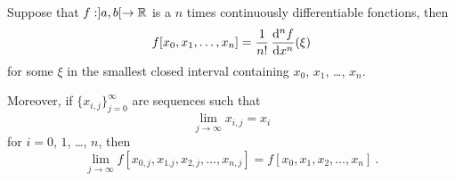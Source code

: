 \begin{prop}
Suppose that $f:]a,b[\rightarrow \mathbb{R}$ is a $n$ times continuously
differentiable fonctions, then
\begin{equation}\label{propA}
f[x_0,x_1,\ldots,x_n] = \frac{1}{n!}\,\frac{\mathrm{d}^{n}{f}}{\mathrm{d}{x}^{n}}(\xi)
\end{equation}
for some $\xi$ in the smallest closed interval containing $x_0$,
$x_1$, \ldots, $x_n$.

Moreover, if $\{x_{i,j}\}_{j=0}^\infty$ are sequences such that
\[
\lim_{j\rightarrow \infty} x_{i,j} = x_i
\]
for $i=0$, $1$, \ldots, $n$, then
\begin{equation}\label{propB}
\lim_{j\rightarrow \infty} f[x_{0,j}, x_{1.j}, x_{2,j}, \ldots, x_{n,j}]
= f[x_0,x_1,x_2,\ldots, x_n] \ .
\end{equation}
\label{prop2_NDDF}
\end{prop}

